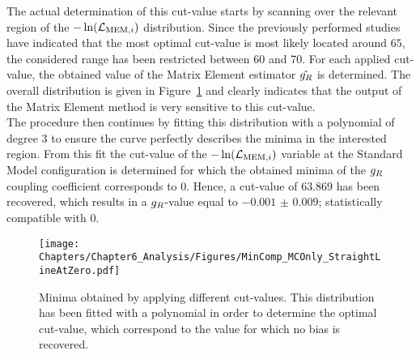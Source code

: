 The actual determination of this cut-value starts by scanning over the relevant region of the $-\ln(\mathcal{L}_{\textrm{MEM}, i})$ distribution.
Since the previously performed studies have indicated that the most optimal cut-value is most likely located around $65$, the considered range has been restricted between 60 and 70.
For each applied cut-value, the obtained value of the Matrix Element estimator $\hat{g_{R}}$ is determined.  %
The overall distribution is given in Figure~\ref{fig::CutValueFit} and clearly indicates that the output of the Matrix Element method is very sensitive to this cut-value.
\\
The procedure then continues by fitting this distribution with a polynomial of degree $3$ to ensure the curve perfectly describes the minima in the interested region. From this fit the cut-value of the $-\ln(\mathcal{L}_{\textrm{MEM}, i})$ variable at the Standard Model configuration is determined for which the obtained minima of the $g_{R}$ coupling coefficient corresponds to $0$.
Hence, a cut-value of $63.869$ has been recovered, which results in a $g_{R}$-value equal to $-0.001$ $\pm$ $0.009$; statistically compatible with $0$.
\\
\begin{figure}[h!t]
 \centering
 \texttt{[image: Chapters/Chapter6\_Analysis/Figures/MinComp\_MCOnly\_StraightLineAtZero.pdf]}  %
 \caption{Minima obtained by applying different cut-values. This distribution has been fitted with a polynomial in order to determine the optimal cut-value, which correspond to the value for which no bias is recovered.} \label{fig::CutValueFit}
\end{figure}



